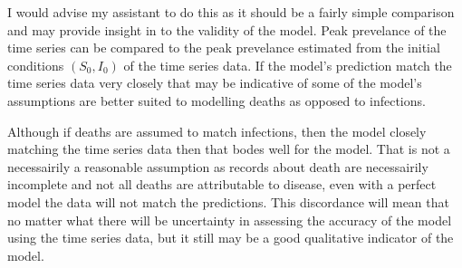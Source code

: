 I would advise my assistant to do this as it should be a fairly simple comparison and may provide insight in to the validity of the model.
Peak prevelance of the time series can be compared to the peak prevelance estimated from the initial conditions $(S_0,I_0)$ of the time series data.
If the model's prediction match the time series data very closely that may be indicative of some of the model's assumptions are better suited to modelling deaths as opposed to infections.\par
Although if deaths are assumed to match infections, then the model closely matching the time series data then that bodes well for the model.
That is not a necessairily a reasonable assumption as records about death are necessairily incomplete and not all deaths are attributable to disease, even with a perfect model the data will not match the predictions.
This discordance will mean that no matter what there will be uncertainty in  assessing the accuracy of the model using the time series data, but it still may  be a good qualitative indicator of the model.
